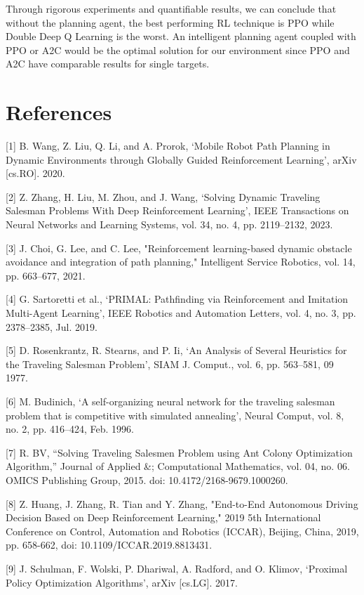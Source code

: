 \documentclass{article}
\begin{document}
	Through rigorous experiments and quantifiable results, we can conclude that without the planning agent, the best performing RL technique is PPO while Double Deep Q Learning is the worst. An intelligent planning agent coupled with PPO or A2C would be the optimal solution for our environment since PPO and A2C have comparable results for single targets.
	
	\section*{References}
	
	[1] B. Wang, Z. Liu, Q. Li, and A. Prorok, ‘Mobile Robot Path Planning in Dynamic Environments through Globally Guided Reinforcement Learning’, arXiv [cs.RO]. 2020.
	
	[2] Z. Zhang, H. Liu, M. Zhou, and J. Wang, ‘Solving Dynamic Traveling Salesman Problems With Deep Reinforcement Learning’, IEEE Transactions on Neural Networks and Learning Systems, vol. 34, no. 4, pp. 2119–2132, 2023.
	
	[3] J. Choi, G. Lee, and C. Lee, "Reinforcement learning-based dynamic obstacle avoidance and integration of path planning," Intelligent Service Robotics, vol. 14, pp. 663–677, 2021. 
	
	[4] G. Sartoretti et al., ‘PRIMAL: Pathfinding via Reinforcement and Imitation Multi-Agent Learning’, IEEE Robotics and Automation Letters, vol. 4, no. 3, pp. 2378–2385, Jul. 2019.
	
	[5] D. Rosenkrantz, R. Stearns, and P. Ii, ‘An Analysis of Several Heuristics for the Traveling Salesman Problem’, SIAM J. Comput., vol. 6, pp. 563–581, 09 1977.
	
	[6] M. Budinich, ‘A self-organizing neural network for the traveling salesman problem that is competitive with simulated annealing’, Neural Comput, vol. 8, no. 2, pp. 416–424, Feb. 1996.
	
	[7] R. BV, “Solving Traveling Salesmen Problem using Ant Colony Optimization Algorithm,” Journal of Applied \&; Computational Mathematics, vol. 04, no. 06. OMICS Publishing Group, 2015. doi: 10.4172/2168-9679.1000260.
	
	[8] Z. Huang, J. Zhang, R. Tian and Y. Zhang, "End-to-End Autonomous Driving Decision Based on Deep Reinforcement Learning," 2019 5th International Conference on Control, Automation and Robotics (ICCAR), Beijing, China, 2019, pp. 658-662, doi: 10.1109/ICCAR.2019.8813431.
	
	[9] J. Schulman, F. Wolski, P. Dhariwal, A. Radford, and O. Klimov, ‘Proximal Policy Optimization Algorithms’, arXiv [cs.LG]. 2017.
	
\end{document}
